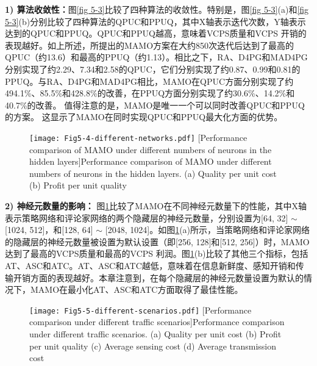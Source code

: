 \textbf{1) 算法收敛性：}图\ref{fig 5-3}比较了四种算法的收敛性。特别是，图\ref{fig 5-3}(a)和\ref{fig 5-3}(b)分别比较了四种算法的QPUC和PPUQ，其中X轴表示迭代次数，Y轴表示达到的QPUC和PPUQ。QPUC和PPUQ越高，意味着VCPS质量和VCPS 开销的表现越好。如上所述，所提出的MAMO方案在大约850次迭代后达到了最高的QPUC（约13.6）和最高的PPUQ（约1.13）。相比之下，RA、D4PG和MAD4PG分别实现了约2.29、7.34和2.58的QPUC，它们分别实现了约0.87、0.99和0.81的PPUQ。与RA、D4PG和MAD4PG相比，MAMO在QPUC方面分别实现了约494.1\%、85.5\%和428.8\%的改善，在PPUQ方面分别实现了约30.6\%、14.2\%和40.7\%的改善。
值得注意的是，MAMO是唯一一个可以同时改善QPUC和PPUQ的方案。
这显示了MAMO在同时实现QPUC和PPUQ最大化方面的优势。

\begin{figure}[h]
 \centering
 \texttt{[image: Fig5-4-different-networks.pdf]}
 [Performance comparison of MAMO under different numbers of neurons in the hidden layers]{Performance comparison of MAMO under different numbers of neurons in the hidden layers. (a) Quality per unit cost (b) Profit per unit quality}
 \label{fig 5-4}
\end{figure}

\textbf{2) 神经元数量的影响：}
图\ref{fig 5-4}比较了MAMO在不同神经元数量下的性能，其中X轴表示策略网络和评论家网络的两个隐藏层的神经元数量，分别设置为[64, 32] $\sim$ [1024, 512]，和[128, 64] $\sim$ [2048, 1024]。如图\ref{fig 5-4}(a)所示，当策略网络和评论家网络的隐藏层的神经元数量被设置为默认设置（即[256, 128]和[512, 256]）时，MAMO达到了最高的VCPS质量和最高的VCPS 利润。图\ref{fig 5-4}(b)比较了其他三个指标，包括AT、ASC和ATC。AT、ASC和ATC越低，意味着在信息新鲜度、感知开销和传输开销方面的表现越好。本章注意到，在每个隐藏层的神经元数量设置为默认的情况下，MAMO在最小化AT、ASC和ATC方面取得了最佳性能。

\begin{figure}[h]
 \centering
 \texttt{[image: Fig5-5-different-scenarios.pdf]}
 [Performance comparison under different traffic scenarios]{Performance comparison under different traffic scenarios. (a) Quality per unit cost (b) Profit per unit quality (c) Average sensing cost (d) Average transmission cost}
 \label{fig 5-5}
\end{figure}

